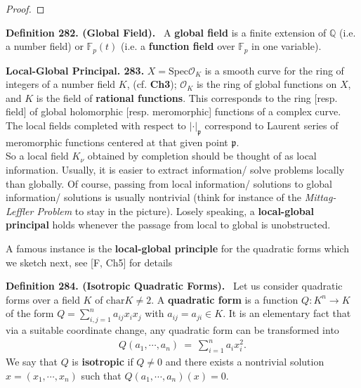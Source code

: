 \documentclass[12pt,a4paper,footinclude=true,headinclude=true]{scrbook} %
\newenvironment{definition}[2][Definition]
    { \begin{mdframed}[backgroundcolor=gray!20] \textbf{#1 #2.}\ }
    {  \end{mdframed}}
\newenvironment{summary}[2][]
    { \begin{mdframed}[backgroundcolor=gray!20] \textbf{#1 #2.} }
    {  \end{mdframed}}
\begin{document}
\begin{proof}
\end{proof}

\begin{definition}{282. (Global Field)}
    \newline A \textbf{global field} is a finite extension of $\mathbb{Q}$ (i.e. a number field) or $\mathbb{F}_p(t)$ (i.e. a \textbf{function field} over $\mathbb{F}_p$ in one variable).
\end{definition}

\begin{summary}{Local-Global Principal. 283}
    \newline $X=\mathrm{Spec}\mathcal{O}_K$ is a smooth curve for the ring of integers of a number field $K$, (cf. \textbf{Ch3}); $\mathcal{O}_K$ is the ring of global functions on $X$, and $K$ is the field of \textbf{rational functions}. This corresponds to the ring [resp. field] of global holomorphic [resp. meromorphic] functions of a complex curve. The local fields completed with respect to $|\cdot|_\mathfrak{p}$ correspond to Laurent series of meromorphic functions centered at that given point $\mathfrak{p}$.\\
    So a local field $K_\nu$ obtained by completion should be thought of as local information. Usually, it is easier to extract information/ solve problems locally than globally. Of course, passing from local information/ solutions to global information/ solutions is usually nontrivial (think for instance of the \textit{Mittag-Leffler Problem} to stay in the picture). Losely speaking, a \textbf{local-global principal} holds whenever the passage from local to global is unobstructed.
\end{summary}
\newpage
A famous instance is the \textbf{local-global principle} for the quadratic forms which we sketch next, see [F, Ch5] for details
\begin{definition}{284. (Isotropic Quadratic Forms)}
    \newline Let us consider quadratic forms over a field $K$ of $\mathrm{char}K\neq2$. A \textbf{quadratic form} is a function $Q:K^n\to K$ of the form $Q=\sum_{i,j=1}^na_{ij}x_ix_j$ with $a_{ij}=a_{ji}\in K$. It is an elementary fact that via a suitable coordinate change, any quadratic form can be transformed into 
    \begin{align*}
        Q(a_1,\cdots,a_n)\ =\ \sum_{i=1}^na_ix_i^2.
    \end{align*}
    We say that $Q$ is \textbf{isotropic} if $Q\neq0$ and there exists a nontrivial solution $x=(x_1,\cdots,x_n)$ such that $Q(a_1,\cdots,a_n)(x)=0$.
\end{definition}
\end{document}
